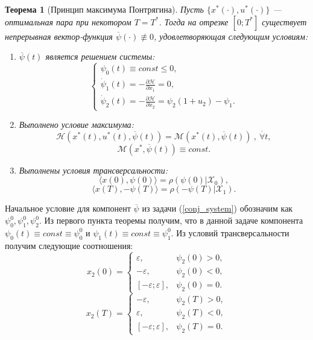 \documentclass[10pt]{article}
\newtheorem{theorem}{Теорема}
\begin{document}
\begin{theorem}[Принцип максимума Понтрягина]
	Пусть \( \{x^*(\cdot), u^*(\cdot) \} \) --- оптимальная пара при некотором \( T = T^* \). Тогда на отрезке \( [0;T^*] \) существует непрерывная вектор-функция \( \overline{\psi}(\cdot) \not\equiv 0 \), удовлетворяющая следующим условиям:
\begin{enumerate}
	\item \( \overline{\psi}(t) \) является решением системы:
	\begin{equation} \label{conj_system}
	\begin{cases} \psi_0(t) \equiv const \le 0, \\ \dot{\psi}_1(t) = -\frac{\partial \mathcal{H}}{\partial x_1} = 0, \\ \dot{\psi}_2(t) = -\frac{\partial \mathcal{H}}{\partial x_2} = \psi_2(1 + u_2) - \psi_1. \end{cases}
	\end{equation}
	\item Выполнено условие максимума:
	\[ \mathcal{H}(x^*(t), u^*(t), \overline{\psi}(t)) = \mathcal{M}(x^*(t), \overline{\psi}(t)) \ , \ \overset{\cdot}{\forall} t ,\]
	\[ \mathcal{M}(x^*, \overline{\psi}(t)) \equiv const. \]
	\item Выполнены условия трансверсальности:
	\[ \langle x(0), \psi(0) \rangle = \rho(\psi(0) | \mathcal{X}_0) , \]
	\[ \langle x(T), -\psi(T) \rangle = \rho(-\psi(T) | \mathcal{X}_1). \]
\end{enumerate}
\end{theorem}
Начальное условие для компонент \( \overline{\psi} \) из задачи (\ref{conj_system}) обозначим как \( \psi_0^0, \psi_1^0, \psi_2^0 \). Из первого пункта теоремы получим, что в данной задаче компонента \( \psi_0(t) \equiv const \equiv \psi_0^0 \) и \( \psi_1(t) \equiv const \equiv \psi_1^0 \).
Из условий трансверсальности получим следующие соотношения:
\[ x_2(0) = \begin{cases} \varepsilon , & \psi_2(0) > 0, \\ -\varepsilon  , & \psi_2(0) < 0, \\ [-\varepsilon; \varepsilon]  , & \psi_2(0) = 0. \end{cases} \]
\[ x_2(T) = \begin{cases} -\varepsilon  , & \psi_2(T) > 0, \\ \varepsilon  , & \psi_2(T) < 0, \\ [-\varepsilon; \varepsilon]  , & \psi_2(T) = 0. \end{cases} \]
\end{document}
